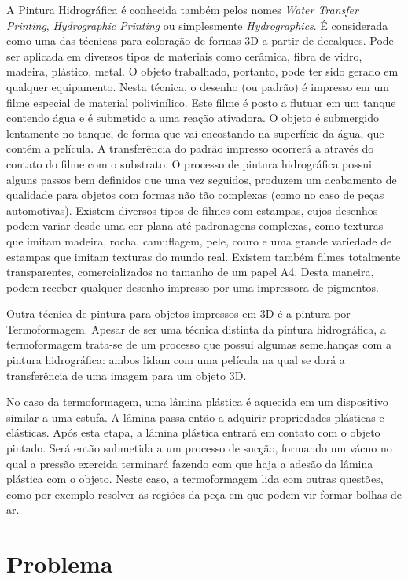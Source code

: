A Pintura Hidrográfica é conhecida também pelos nomes \textit{Water Transfer Printing}, \textit{Hydrographic Printing} ou simplesmente \textit{Hydrographics}. É considerada como uma das técnicas para coloração de formas 3D a partir de decalques. Pode ser aplicada em diversos tipos de materiais como cerâmica, fibra de vidro, madeira, plástico, metal. O objeto trabalhado, portanto, pode ter sido gerado em qualquer equipamento. Nesta técnica, o desenho (ou padrão) é impresso em um filme especial de material polivinílico. Este filme é posto a flutuar em um tanque contendo água e é submetido a uma reação ativadora. O objeto é submergido lentamente no tanque, de forma que vai encostando na superfície da água, que contém a película. A transferência do padrão impresso ocorrerá a através do contato do filme com o substrato. O processo de pintura hidrográfica possui alguns passos bem definidos que uma vez seguidos, produzem um acabamento de qualidade para objetos com formas não tão complexas (como no caso de peças automotivas). Existem diversos tipos de filmes com estampas, cujos desenhos podem variar desde uma cor plana até padronagens complexas, como texturas que imitam madeira, rocha, camuflagem, pele, couro e uma grande variedade de estampas que imitam texturas do mundo real. Existem também filmes totalmente transparentes, comercializados no tamanho de um papel A4. Desta maneira, podem receber qualquer desenho impresso por uma impressora de pigmentos.

Outra técnica de pintura para objetos impressos em 3D é a pintura por Termoformagem. Apesar de ser uma técnica distinta da pintura hidrográfica, a termoformagem trata-se de um processo que possui algumas semelhanças com a pintura hidrográfica: ambos lidam com uma película na qual se dará a transferência de uma imagem para um objeto 3D.

No caso da termoformagem, uma lâmina plástica é aquecida em um dispositivo similar a uma estufa. A lâmina passa então a adquirir propriedades plásticas e elásticas. Após esta etapa, a lâmina plástica entrará em contato com o objeto pintado. Será então submetida a um processo de sucção, formando um vácuo no qual a pressão exercida terminará fazendo com que haja a adesão da lâmina plástica com o objeto. Neste caso, a termoformagem lida com outras questões, como por exemplo resolver as regiões da peça em que podem vir formar bolhas de ar.

\section{Problema}

